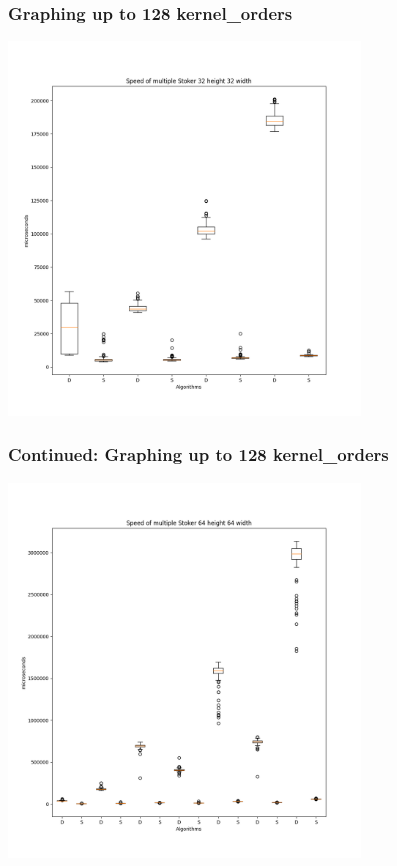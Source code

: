 \documentclass{beamer}
\begin{document}
\begin{frame}[fragile]
\frametitle{Graphing up to 128 kernel\_orders}
\includegraphics[width=0.7\textwidth]{images/Stoker-32-32}
\end{frame}

\begin{frame}[fragile]
\frametitle{Continued: Graphing up to 128 kernel\_orders}
\includegraphics[width=0.7\textwidth]{images/Stoker-64-64}
\end{frame}
\end{document}

